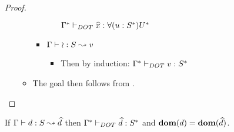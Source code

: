 \begin{proof}
\begin{itemize}
\begin{itemize}
\begin{itemize}
\begin{itemize}
                        $\Gamma^{*} \vdash_{DOT} \widehat{x}: \forall(u:S^{*})U^{*}$
                \end{itemize}
                \item $\Gamma \vdash \wr: S \leadsto v$
                \begin{itemize}
                    \item Then by induction:
                        $\Gamma^{*} \vdash_{DOT} v: S^{*}$
                \end{itemize}
            \end{itemize}
        \item The goal then follows from .
        \end{itemize}
    \end{itemize}
\end{proof}

\vspace{-3mm}

\begin{THEOREM}
    \label{tp_defs}
    If $\Gamma \vdash d: S \leadsto \widehat{d}$ then
    $\Gamma^{*} \vdash_{DOT} \widehat{d}: S^{*}$ and $\textbf{dom}(d) =
    \textbf{dom}(\widehat{d})$.
\end{THEOREM}

